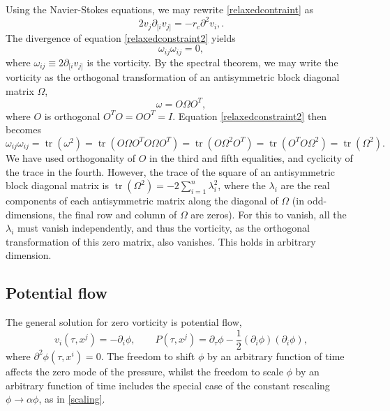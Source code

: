 \documentclass[12pt,a4paper]{article}
\DeclareMathOperator{\tr}{tr}
\begin{document}
Using the Navier-Stokes equations, we may rewrite \eqref{relaxedcontraint} as
\begin{equation}
2v_j\partial_{[i}v_{j]}=-r_c\partial^2v_i, \label{relaxedconstraint2}.
\end{equation}
The divergence of equation \eqref{relaxedconstraint2} yields
\begin{equation}
\omega_{ij}\omega_{ij}=0,
\end{equation}
where $\omega_{ij}\equiv2\partial_{[i}v_{j]}$ is the vorticity. By the spectral theorem, we may write the vorticity as the orthogonal transformation of an antisymmetric block diagonal matrix $\Omega$,
\begin{equation}
\omega		=		O \Omega O^T,
\end{equation}
where $O$ is orthogonal $O^T O = O O^T = I$. Equation \eqref{relaxedconstraint2} then becomes
\begin{equation}
\omega_{ij}\omega_{ij}	=		\tr ( \omega^2 )		=		\tr ( O \Omega O^T		O \Omega O^T )		=		\tr ( O \Omega^2 O^T )		=		\tr ( O^T O \Omega^2 )		=		\tr ( \Omega^2 ).
\end{equation}
We have used orthogonality of $O$ in the third and fifth equalities, and cyclicity of the trace in the fourth. However, the trace of the square of an antisymmetric block diagonal matrix is $ \tr ( \Omega^2 )	=	- 2 \sum_{i=1}^n \lambda_i^2 $, where the $\lambda_i$ are the real components of each antisymmetric matrix along the diagonal of $\Omega$ (in odd-dimensions, the final row and column of $\Omega$ are zeros). For this to vanish, all the $\lambda_i$ must vanish independently, and thus the vorticity, as the orthogonal transformation of this zero matrix, also vanishes. This holds in arbitrary dimension.

\subsection{Potential flow}

The general solution for zero vorticity is potential flow,
\begin{equation}
v_i(\tau,x^j)=-\partial_i \phi, \qquad P(\tau,x^j)=\partial_\tau \phi-\frac{1}{2}(\partial_i \phi)(\partial_i \phi),
\end{equation}
where $\partial^2 \phi(\tau,x^i)=0$. The freedom to shift $\phi$ by an arbitrary function of time affects the zero mode of the pressure, whilst the freedom to scale $\phi$ by an arbitrary function of time includes the special case of the constant rescaling $\phi \rightarrow \alpha \phi$, as in \eqref{scaling}.
\end{document}
